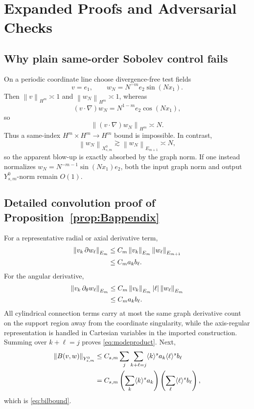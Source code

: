 \documentclass[11pt]{article}
\numberwithin{equation}{section}
\newcommand{\norm}[1]{\left\lVert #1\right\rVert}
\begin{document}
\section{Expanded Proofs and Adversarial Checks}\label{app:proofs}

\subsection{Why plain same-order Sobolev control fails}
On a periodic coordinate line choose divergence-free test fields
\begin{equation}
v=e_1,
\qquad
w_N=N^{-m}e_2\sin(Nx_1).
\label{eq:hfcounter}
\end{equation}
Then \(\norm v_{H^m}\asymp1\) and \(\norm{w_N}_{H^m}\asymp1\), whereas
\begin{equation}
(v\cdot\nabla)w_N=N^{1-m}e_2\cos(Nx_1),
\label{eq:hfconv}
\end{equation}
so
\begin{equation}
\norm{(v\cdot\nabla)w_N}_{H^m}\asymp N.
\label{eq:hfblow}
\end{equation}
Thus a same-index \(H^m\times H^m\to H^m\) bound is impossible.  In contrast,
\begin{equation}
\norm{w_N}_{X^0_{s,m}}\gtrsim\norm{w_N}_{E_{m+1}}\asymp N,
\label{eq:hfgraph}
\end{equation}
so the apparent blow-up is exactly absorbed by the graph norm.  If one instead normalizes \(w_N=N^{-m-1}\sin(Nx_1)e_2\), both the input graph norm and output \(Y^0_{s,m}\)-norm remain \(O(1)\).

\subsection{Detailed convolution proof of Proposition~\ref{prop:Bappendix}}
For a representative radial or axial derivative term,
\begin{align}
\norm{v_k\,\partial w_\ell}_{E_m}
&\le C_m\norm{v_k}_{E_m}\norm{w_\ell}_{E_{m+1}}\notag\\
&\le C_ma_kb_\ell.
\label{eq:convra}
\end{align}
For the angular derivative,
\begin{align}
\norm{v_k\,\partial_\theta w_\ell}_{E_m}
&\le C_m\norm{v_k}_{E_m}|\ell|\norm{w_\ell}_{E_m}\notag\\
&\le C_ma_kb_\ell.
\label{eq:convtheta}
\end{align}
All cylindrical connection terms carry at most the same graph derivative count on the support region away from the coordinate singularity, while the axis-regular representation is handled in Cartesian variables in the imported construction.  Summing over \(k+\ell=j\) proves \eqref{eq:modeproduct}.  Next,
\begin{align}
\norm{B(v,w)}_{Y^0_{s,m}}
&\le C_{s,m}\sum_j\sum_{k+\ell=j}\langle k\rangle^sa_k\langle\ell\rangle^sb_\ell\notag\\
&=C_{s,m}\left(\sum_k\langle k\rangle^sa_k\right)
\left(\sum_\ell\langle\ell\rangle^sb_\ell\right),
\label{eq:young}
\end{align}
which is \eqref{eq:bilbound}.
\end{document}
